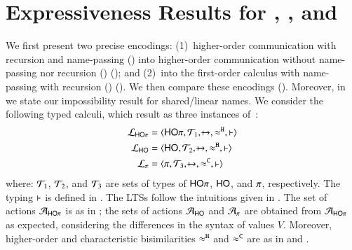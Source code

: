 \documentclass[preprint,11pt]{elsarticle}
\begin{document}
{%

\section{Expressiveness Results for \HOp, \HO, and \sessp}
\label{sec:positive}
%
 We first present two %
 precise encodings: 
(1)~higher-order communication with recursion and name-passing   (\HOp) into 
higher-order communication without name-passing nor recursion (\HO) (); and 
(2)~\HOp into the first-order calculus with name-passing  
with recursion (\sessp) ().
We then compare these  encodings (). 
Moreover, in  we state our impossibility result for shared/linear names.
We consider the following typed calculi, which result as three instances of~:
\begin{align*}
	\mathcal{L}_{\mathsf{HO}\pi} & =\langle \mathsf{HO}\pi, {\cal{T}}_1, \xmapsto{~}, \approx^\mathtt{H}, \vdash \rangle
	\\
	\mathcal{L}_{\mathsf{HO}} & =\langle \mathsf{HO}, {\cal{T}}_2, \xmapsto{~}, \approx^\mathtt{H}, \vdash \rangle
	\\
	\mathcal{L}_{\pi} & =\langle \pi, {\cal{T}}_3, \xmapsto{~}, \approx^\mathtt{C}, \vdash \rangle
\end{align*}
where: 
${\cal{T}}_1$, ${\cal{T}}_2$, 
and ${\cal{T}}_3$
are sets of types of $\mathsf{HO}\pi$, $\mathsf{HO}$, and $\pi$, respectively. 
The typing $\vdash$ is defined in 
.
The LTSs follow the intuitions given in .
The set of actions $\mathcal{A}_{\mathsf{HO}\pi}$ is as in ; the sets of actions $\mathcal{A}_\mathsf{HO}$ and $\mathcal{A}_\pi$ 
are obtained from $\mathcal{A}_{\mathsf{HO}\pi}$ 
as expected, considering the differences in the syntax of values $V$.
Moreover, higher-order and characteristic bisimilarities
$\approx^\mathtt{H}$ 
and 
$\approx^\mathtt{C}$ are 
as in  and .

}
\end{document}
